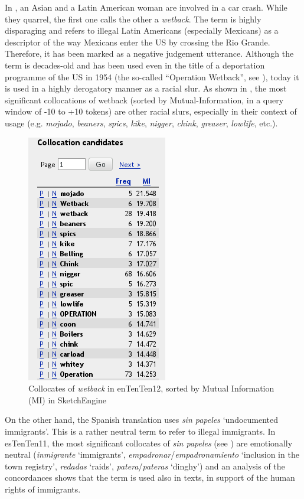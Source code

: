 \documentclass[output=paper]{LSP/langsci}
\begin{document}
In , an Asian and a Latin American woman are involved in a car crash. While they quarrel, the first one calls the other a \textit{wetback}. The term is highly disparaging and refers to illegal Latin Americans (especially Mexicans) as a descriptor of the way Mexicans enter the US by crossing the Rio Grande. Therefore, it has been marked as a negative judgement utterance. Although the term is decades-old and has been used even in the title of a deportation programme of the US in 1954 (the so-called “Operation Wetback”, see \citealt{Hernandez2006}), today it is used in a highly derogatory manner as a racial slur. As shown in , the most significant collocations of wetback (sorted by Mutual-Information, in a query window of {-10 to +10} tokens) are other racial slurs, especially in their context of usage (e.g. \textit{mojado}, \textit{beaners}, \textit{spics}, \textit{kike}, \textit{nigger}, \textit{chink}, \textit{greaser}, \textit{lowlife}, etc.).

\begin{figure}
\includegraphics[width=.3\textwidth]{./figures/4-5.png}
\caption{Collocates of \emph{wetback} in enTenTen12, sorted by Mutual Information (MI) in SketchEngine} \label{fig:2:6}
\end{figure}

On the other hand, the Spanish translation uses \textit{sin papeles} `undocumented immigrants'. This is a rather neutral term to refer to illegal immigrants. In esTenTen11, the most significant collocates of \textit{sin papeles} (see ) are emotionally neutral (\textit{inmigrante} `immigrants', \textit{empadronar}/\textit{empadronamiento} `inclusion in the town registry', \textit{redadas} `raids', \textit{patera}/\textit{pateras} `dinghy') and an analysis of the concordances shows that the term is used also in texts, in support of the human rights of immigrants.
\end{document}

